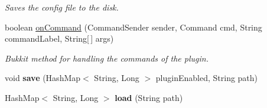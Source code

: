 \begin{DoxyCompactItemize}
\begin{DoxyCompactList}\small\item\em \-Saves the config file to the disk. \end{DoxyCompactList}\item 
boolean \hyperlink{classcom_1_1github_1_1zephyrz4_1_1antiaddict_1_1antiaddict_adbfbbfe423e6f9ac7871905820786677}{on\-Command} (\-Command\-Sender sender, \-Command cmd, \-String command\-Label, \-String\mbox{[}$\,$\mbox{]} args)
\begin{DoxyCompactList}\small\item\em \-Bukkit method for handling the commands of the plugin. \end{DoxyCompactList}\item 
\hypertarget{classcom_1_1github_1_1zephyrz4_1_1antiaddict_1_1antiaddict_ad458d95910077456c443f37c9a02f075}{void {\bfseries save} (\-Hash\-Map$<$ \-String, \-Long $>$ plugin\-Enabled, \-String path)}\label{classcom_1_1github_1_1zephyrz4_1_1antiaddict_1_1antiaddict_ad458d95910077456c443f37c9a02f075}

\item 
\hypertarget{classcom_1_1github_1_1zephyrz4_1_1antiaddict_1_1antiaddict_a2a8c75270ba8a6771b208b0c4a997db4}{\-Hash\-Map$<$ \-String, \-Long $>$ {\bfseries load} (\-String path)}\label{classcom_1_1github_1_1zephyrz4_1_1antiaddict_1_1antiaddict_a2a8c75270ba8a6771b208b0c4a997db4}

\end{DoxyCompactItemize}
